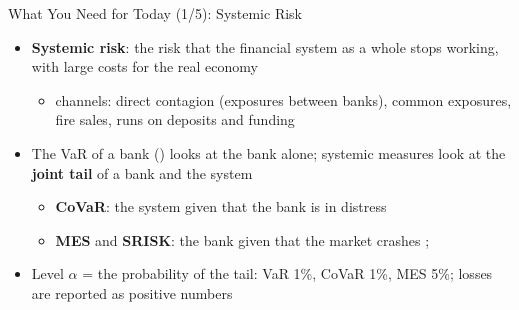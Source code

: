 \begin{frame}{What You Need for Today (1/5): Systemic Risk}
\itemsize{\small}
\begin{itemize}
    \item \textbf{Systemic risk}: the risk that the financial system as a whole stops working, with large costs for the real economy 
    \begin{itemize}
        \item channels: direct contagion (exposures between banks), common exposures, fire sales, runs on deposits and funding
    \end{itemize}
    \item The VaR of a bank () looks at the bank alone; systemic measures look at the \textbf{joint tail} of a bank and the system
    \begin{itemize}
        \item \textbf{CoVaR}: the system given that the bank is in distress 
        \item \textbf{MES} and \textbf{SRISK}: the bank given that the market crashes ; 
    \end{itemize}
    \item Level $\alpha$ = the probability of the tail: VaR 1\%, CoVaR 1\%, MES 5\%; losses are reported as positive numbers
\end{itemize}
\end{frame}

